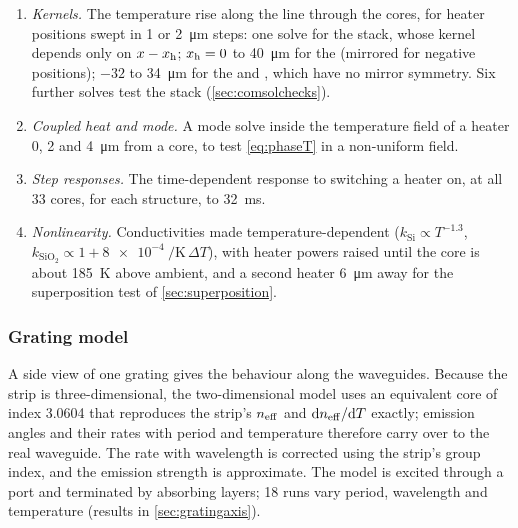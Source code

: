 \begin{enumerate}
  \item \emph{Kernels.} The temperature rise along the line through the cores, for heater positions swept in
        \qty{1}{} or \qty{2}{\micro\metre} steps: one solve for the  stack, whose kernel depends only
        on $x-x_{\mathrm{h}}$; $x_{\mathrm{h}}=0$ to \qty{40}{\micro\metre} for the  (mirrored for negative positions);
        $-32$ to \qty{34}{\micro\metre} for the  and , which have no mirror symmetry.
        Six further solves test the stack (\cref{sec:comsolchecks}).
  \item \emph{Coupled heat and mode.} A mode solve inside the temperature field of a heater 0, 2 and
        \qty{4}{\micro\metre} from a core, to test \cref{eq:phaseT} in a non-uniform field.
  \item \emph{Step responses.} The time-dependent response to switching a heater on, at all \num{33} cores, for
        each structure, to \qty{32}{\milli\second}.
  \item \emph{Nonlinearity.} Conductivities made temperature-dependent ($k_\mathrm{Si}\propto T^{-1.3}$,
        $k_\mathrm{SiO_2}\propto1+\qty{8e-4}{\per\kelvin}\,\Delta T$), with heater powers raised until the core is
        about \qty{185}{\kelvin} above ambient, and a second heater \qty{6}{\micro\metre} away for the superposition
        test of \cref{sec:superposition}.
\end{enumerate}

\subsubsection{Grating model}
\label{sec:modelE}

A side view of one grating gives the behaviour along the waveguides. Because the strip is three-dimensional, the
two-dimensional model uses an equivalent core of index \num{3.0604} that reproduces the strip's $n_{\mathrm{eff}}$ and
$\mathrm{d}n_{\mathrm{eff}}/\mathrm{d}T$ exactly; emission angles and their rates with period and temperature therefore carry over to the real
waveguide. The rate with wavelength is corrected using the strip's group index, and the emission strength is
approximate. The model is excited through a port and terminated by absorbing layers; \num{18} runs vary period,
wavelength and temperature (results in \cref{sec:gratingaxis}).
